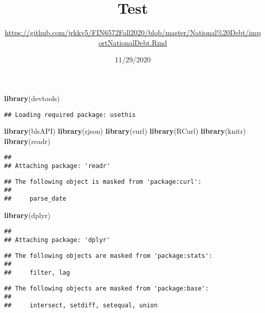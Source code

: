 \documentclass[
]{article}
\title{Test}
\author{\url{https://github.com/jrkkv5/FIN6572Fall2020/blob/master/National\%20Debt/importNationalDebt.Rmd}}
\date{11/29/2020}
\newenvironment{Shaded}{\begin{snugshade}}{\end{snugshade}}
\newcommand{\KeywordTok}[1]{\textcolor[rgb]{0.13,0.29,0.53}{\textbf{#1}}}
\newcommand{\NormalTok}[1]{#1}
\begin{document}
\maketitle

\begin{Shaded}
\begin{Highlighting}[]
\KeywordTok{library}\NormalTok{(devtools)}
\end{Highlighting}
\end{Shaded}

\begin{verbatim}
## Loading required package: usethis
\end{verbatim}

\begin{Shaded}
\begin{Highlighting}[]
\KeywordTok{library}\NormalTok{(blsAPI)}
\KeywordTok{library}\NormalTok{(rjson)}
\KeywordTok{library}\NormalTok{(curl)}
\KeywordTok{library}\NormalTok{(RCurl)}
\KeywordTok{library}\NormalTok{(knitr)}
\KeywordTok{library}\NormalTok{(readr)}
\end{Highlighting}
\end{Shaded}

\begin{verbatim}
## 
## Attaching package: 'readr'
\end{verbatim}

\begin{verbatim}
## The following object is masked from 'package:curl':
## 
##     parse_date
\end{verbatim}

\begin{Shaded}
\begin{Highlighting}[]
\KeywordTok{library}\NormalTok{(dplyr)}
\end{Highlighting}
\end{Shaded}

\begin{verbatim}
## 
## Attaching package: 'dplyr'
\end{verbatim}

\begin{verbatim}
## The following objects are masked from 'package:stats':
## 
##     filter, lag
\end{verbatim}

\begin{verbatim}
## The following objects are masked from 'package:base':
## 
##     intersect, setdiff, setequal, union
\end{verbatim}
\end{document}
